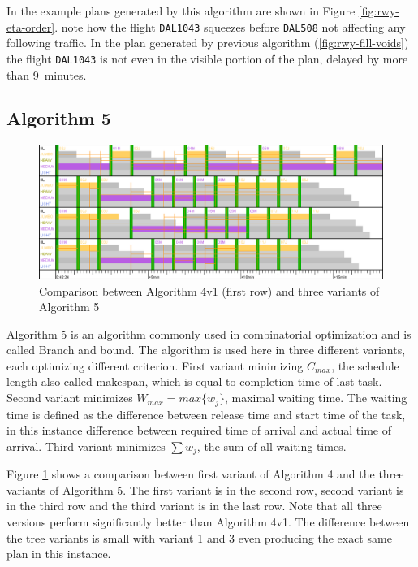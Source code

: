 In the example plans generated by this algorithm are shown in Figure \ref{fig:rwy-eta-order}. note how the flight \texttt{DAL1043} squeezes before \texttt{DAL508} not affecting any following traffic. In the plan generated by previous algorithm (\ref{fig:rwy-fill-voids}) the flight \texttt{DAL1043} is not even in the visible portion of the plan, delayed by more than \mbox{9 minutes}.


\subsection{Algorithm 5}

\begin{figure}[h]
    \centering
    \includegraphics[width=\textwidth]{figures/rwy-bab.png}
    \caption{Comparison between Algorithm 4v1 (first row) and three variants of Algorithm 5}
    \label{fig:rwy-bab}
\end{figure}

Algorithm 5 is an algorithm commonly used in combinatorial optimization and is called Branch and bound. \cite{bab} The algorithm is used here in three different variants, each optimizing different criterion. First variant minimizing $C_{max}$, the schedule length also called makespan, which is equal to completion time of last task.  Second variant minimizes $W_{max} = max\{w_j\}$, maximal waiting time. The waiting time is defined as the difference between release time and start time of the task, in this instance difference between required time of arrival and actual time of arrival. Third variant minimizes $\sum{w_j}$, the sum of all waiting times.

Figure \ref{fig:rwy-bab} shows a comparison between first variant of Algorithm 4 and the three variants of Algorithm 5. The first variant is in the second row, second variant is in the third row and the third variant is in the last row. Note that all three versions perform significantly better than Algorithm 4v1. The difference between the tree variants is small with variant 1 and 3 even producing the exact same plan in this instance.

